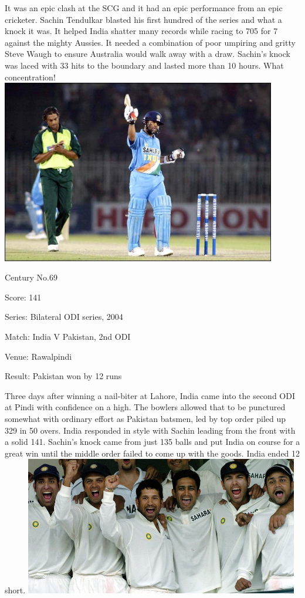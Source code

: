 \documentclass[11pt, a4paper]{article}
\begin{document}
It was an epic clash at the SCG and it had an epic performance from an epic cricketer. Sachin Tendulkar blasted his first hundred of the series and what a knock it was. It helped India shatter many records while racing to 705 for 7 against the mighty Aussies. It needed a combination of poor umpiring and gritty Steve Waugh to ensure Australia would walk away with a draw. Sachin's knock was laced with 33 hits to the boundary and lasted more than 10 hours. What concentration!
\newpage
\includegraphics[width=0.9\textwidth]{pics/69.jpg}

Century No.69 

Score: 141 

Series: Bilateral ODI series, 2004 

Match: India V Pakistan, 2nd ODI 

Venue: Rawalpindi 

Result: Pakistan won by 12 runs 

Three days after winning a nail-biter at Lahore, India came into the second ODI at Pindi with confidence on a high. The bowlers allowed that to be punctured somewhat with ordinary effort as Pakistan batsmen, led by top order piled up 329 in 50 overs. India responded in style with Sachin leading from the front with a solid 141. Sachin's knock came from just 135 balls and put India on course for a great win until the middle order failed to come up with the goods. India ended 12 short.
\newpage
\includegraphics[width=0.9\textwidth]{pics/70.jpg}
\end{document}
